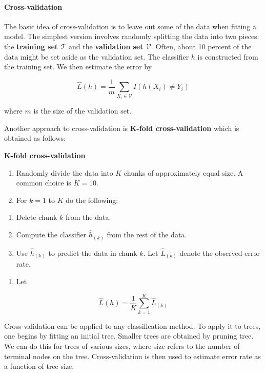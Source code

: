 \paragraph{Cross-validation}\label{cross-validation}

The basic idea of cross-validation is to leave out some of the data when
fitting a model. The simplest version involves randomly splitting the
data into two pieces: the \textbf{training set \(\mathcal{T}\)} and the
\textbf{validation set \(\mathcal{V}\)}. Often, about 10 percent of the
data might be set aside as the validation set. The classifier \(h\) is
constructed from the training set. We then estimate the error by

\[ \hat{L}(h) = \frac{1}{m} \sum_{X_{i} \in \mathcal{V}} I(h(X_{i}) \neq Y_{i}) \]

where \(m\) is the size of the validation set.

Another approach to cross-validation is \textbf{K-fold cross-validation}
which is obtained as follows:

\textbf{K-fold cross-validation}

\begin{enumerate}
\def\labelenumi{\arabic{enumi}.}
\item
  Randomly divide the data into \(K\) chunks of approximately equal
  size. A common choice is \(K = 10\).
\item
  For \(k = 1\) to \(K\) do the following:
\end{enumerate}

\begin{enumerate}
\def\labelenumi{(\alph{enumi})}
\item
  Delete chunk \(k\) from the data.
\item
  Compute the classifier \(\hat{h}_{(k)}\) from the rest of the data.
\item
  Use \(\hat{h}_{(k)}\) to predict the data in chunk \(k\). Let
  \(\hat{L}_{(k)}\) denote the observed error rate.
\end{enumerate}

\begin{enumerate}[tightlist,label={\arabic*.},resume]
\item
  Let
\end{enumerate}

\[ \hat{L}(h) = \frac{1}{K} \sum_{k=1}^K \hat{L}_{(k)} \]

Cross-validation can be applied to any classification method. To apply
it to trees, one begins by fitting an initial tree. Smaller trees are
obtained by pruning tree. We can do this for trees of various sizes,
where size refers to the number of terminal nodes on the tree.
Cross-validation is then used to estimate error rate as a function of
tree size.

